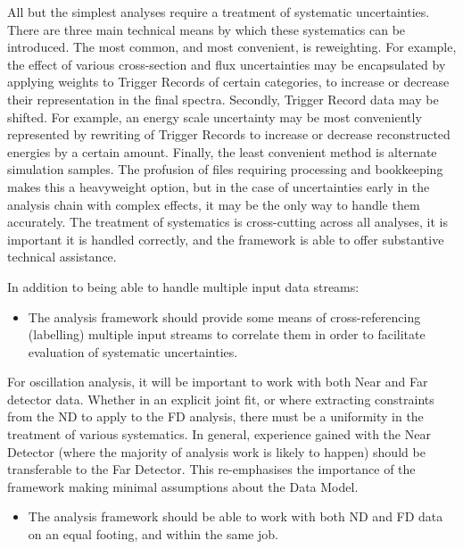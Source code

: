 \documentclass[../main-v1.tex]{subfiles}
\begin{document}
All but the simplest analyses require a treatment of systematic uncertainties. There are three main technical means by which these systematics can be introduced. The most common, and most convenient, is reweighting. For example, the effect of various cross-section and flux uncertainties may be encapsulated by applying weights to Trigger Records of certain categories, to increase or decrease their representation in the final spectra. Secondly, Trigger Record data may be shifted. For example, an energy scale uncertainty may be most conveniently represented by rewriting of Trigger Records to increase or decrease reconstructed energies by a certain amount. Finally, the least convenient method is alternate simulation samples. The profusion of files requiring processing and bookkeeping makes this a heavyweight option, but in the case of uncertainties early in the analysis chain with complex effects, it may be the only way to handle them accurately. The treatment of systematics is cross-cutting across all analyses, it is important it is handled correctly, and the framework is able to offer substantive technical assistance.

In addition to being able to handle multiple input data streams:

\begin{itemize}
\item The analysis framework should provide some means of cross-referencing (labelling) multiple input streams to correlate them in order to facilitate evaluation of systematic uncertainties.
\end{itemize}

For oscillation analysis, it will be important to work with both Near and Far detector data. Whether in an explicit joint fit, or where extracting constraints from the ND to apply to the FD analysis, there must be a uniformity in the treatment of various systematics. In general, experience gained with the Near Detector (where the majority of analysis work is likely to happen) should be transferable to the Far Detector.  This re-emphasises the importance of the framework making minimal assumptions about the Data Model.


\begin{itemize}
\item The analysis framework should be able to work with both ND and FD data on an equal footing, and within the same job.


\end{itemize}
\end{document}
